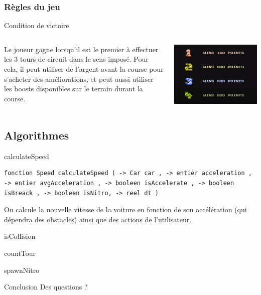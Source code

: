 \documentclass[10pt,dvipsnames,final]{beamer}
\newcommand{\midcolumn}[2]{
\begin{columns}
	\begin{column}{0.5\textwidth}
		#1
	\end{column}
	\begin{column}{0.5\textwidth}
		#2
	\end{column}
\end{columns}
}
\begin{document}
\subsubsection{Règles du jeu}

\begin{frame}{Condition de victoire}
\midcolumn{Le joueur gagne lorsqu'il est le premier à effectuer les 3 tours de circuit dans le sens imposé. Pour cela, il peut utiliser de l'argent avant la course pour s'acheter des améliorations, et peut aussi utiliser les boosts disponibles sur le terrain durant la course.}{\includegraphics[width=\textwidth]{presentationfiles/fin_partie}} 
\end{frame}

\subsection{Algorithmes}

\begin{frame}[fragile]{calculateSpeed}
\begin{lstlisting}[language=pdl]
fonction Speed calculateSpeed ( -> Car car , -> entier acceleration , -> entier avgAcceleration , -> booleen isAccelerate , -> booleen isBreack , -> booleen isNitro, -> reel dt )
\end{lstlisting}

On calcule la nouvelle vitesse de la voiture en fonction de son accélération (qui dépendra des obstacles) ainsi que des actions de l'utilisateur.
\end{frame}

\begin{frame}{isCollision}

\end{frame}

\begin{frame}{countTour}

\end{frame}

\begin{frame}{spawnNitro}

\end{frame}

\begin{frame}{Conclusion}
\Huge\centering
Des questions ?
\end{frame}
\end{document}

